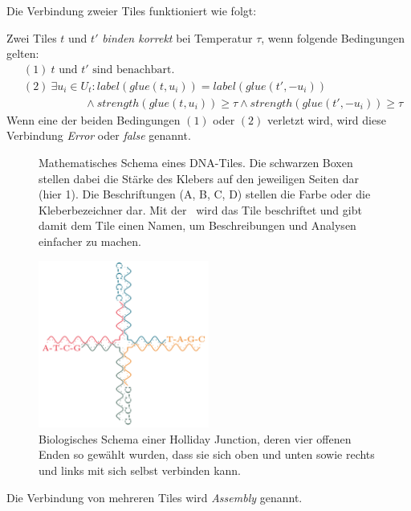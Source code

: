 Die Verbindung zweier Tiles funktioniert wie folgt:
\begin{definition}
	Zwei Tiles $t$ und $t'$ \emph{binden korrekt} bei Temperatur $\tau$, wenn folgende Bedingungen gelten:
	\begin{align*}
		&(1)~ t \text{ und } t' \text{ sind benachbart.}\\
		&(2)~ \exists u_i\in U_t: label(glue(t,u_i)) = label(glue(t',-u_i)) \\
		&\qquad\qquad\quad~~\land strength(glue(t,u_i)) \geq \tau \land strength(glue(t',-u_i)) \geq \tau
	\end{align*}
	Wenn eine der beiden Bedingungen $(1)$ oder $(2)$ verletzt wird, wird diese Verbindung \emph{Error} oder \emph{false} genannt.
\end{definition} 

\begin{figure}
	\centering
	\caption[Mathematisches Schema eines DNA-Tiles]{Mathematisches Schema eines DNA-Tiles. Die schwarzen Boxen stellen dabei die Stärke des Klebers auf den jeweiligen Seiten dar (hier 1). Die Beschriftungen (A, B, C, D) stellen die Farbe oder die Kleberbezeichner dar. Mit der \grqq\, wird das Tile beschriftet und gibt damit dem Tile einen Namen, um Beschreibungen und Analysen einfacher zu machen.}
	\label{fig:dna_tile_math}
\end{figure}


\begin{figure}
	\centering
	\includegraphics[width=0.5\textwidth]{images/DNA_Tile.png}
	\caption[Biologisches Schema einer Holliday Junction]{Biologisches Schema einer Holliday Junction, deren vier offenen Enden so gewählt wurden, dass sie sich oben und unten sowie rechts und links mit sich selbst verbinden kann.\cite{lau2019dnatiles}}
	\label{fig:dna_tile_bio}
\end{figure}
Die Verbindung von mehreren Tiles wird \emph{Assembly} genannt.


